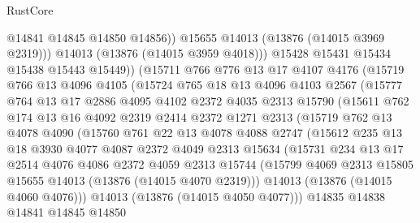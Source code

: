 \begin{lexlean}{RustCore}
\begin{coremodule}
                    @14841
                    @14845
                    @14850
                    @14856))
                @15655
                @14013
                (@13876 (@14015 @3969 @2319)))
              @14013
              (@13876 (@14015 @3959 @4018)))
            @15428
            @15431
            @15434
            @15438
            @15443
            @15449))
        (@15711
          @766
          @776
          @13
          @17
          @4107
          @4176
          (@15719
            @766
            @13
            @4096
            @4105
            (@15724
              @765
              @18
              @13
              @4096
              @4103
              @2567
              (@15777
                @764
                @13
                @17
                @2886
                @4095
                @4102
                @2372
                @4035
                @2313
                @15790
                (@15611
                  @762
                  @174
                  @13
                  @16
                  @4092
                  @2319
                  @2414
                  @2372
                  @1271
                  @2313
                  (@15719
                    @762
                    @13
                    @4078
                    @4090
                    (@15760
                      @761
                      @22
                      @13
                      @4078
                      @4088
                      @2747
                      (@15612
                        @235
                        @13
                        @18
                        @3930
                        @4077
                        @4087
                        @2372
                        @4049
                        @2313
                        @15634
                        (@15731
                          @234
                          @13
                          @17
                          @2514
                          @4076
                          @4086
                          @2372
                          @4059
                          @2313
                          @15744
                          (@15799 @4069 @2313 @15805 @15655 @14013 (@13876 (@14015 @4070 @2319)))
                          @14013
                          (@13876 (@14015 @4060 @4076)))
                        @14013
                        (@13876 (@14015 @4050 @4077)))
                      @14835
                      @14838
                      @14841
                      @14845
                      @14850

\end{coremodule}
\end{lexlean}
